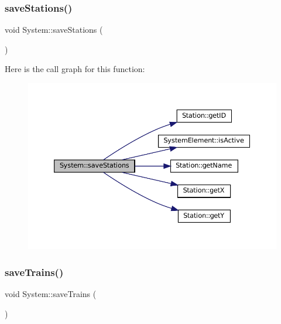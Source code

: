 \mbox{\label{classSystem_a4c246427b8cb72dfe2d7db89d7144d3a}} 
\subsubsection{\texorpdfstring{save\+Stations()}{saveStations()}}
{\footnotesize\ttfamily void System\+::save\+Stations (\begin{DoxyParamCaption}{ }\end{DoxyParamCaption})}

Here is the call graph for this function\+:
\nopagebreak
\begin{figure}[H]
\begin{center}
\leavevmode
\includegraphics[width=350pt]{classSystem_a4c246427b8cb72dfe2d7db89d7144d3a_cgraph}
\end{center}
\end{figure}
\mbox{\label{classSystem_a83c5a9ae95096cbd03ba559b042ee5e1}} 
\subsubsection{\texorpdfstring{save\+Trains()}{saveTrains()}}
{\footnotesize\ttfamily void System\+::save\+Trains (\begin{DoxyParamCaption}{ }\end{DoxyParamCaption})}

